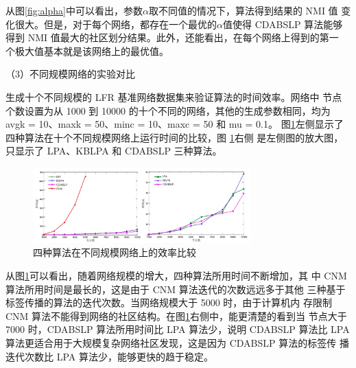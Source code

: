 从图\ref{fig:alpha}中可以看出，参数$\alpha$取不同值的情况下，算法得到结果的 NMI 值
变化很大。但是，对于每个网络，都存在一个最优的$\alpha$值使得 CDABSLP 算法能够
得到 NMI 值最大的社区划分结果。此外，还能看出，在每个网络上得到的第一
个极大值基本就是该网络上的最优值。

（3）不同规模网络的实验对比

生成十个不同规模的 LFR 基准网络数据集来验证算法的时间效率。网络中
节点个数设置为从 1000 到 10000 的十个不同的网络，其他的生成参数相同，均为
avgk = 10、maxk = 50、minc = 10、maxc = 50 和 mu = 0.1。 
图\ref{fig:butongguimowangluobijiao}左侧显示了四种算法在十个不同规模网络上运行时间的比较，图 \ref{fig:butongguimowangluobijiao}右侧
是左侧图的放大图，只显示了 LPA、KBLPA 和 CDABSLP 三种算法。

\begin{figure}
  \centering
  \includegraphics[width=0.75\textwidth]{figures/butongguimowangluobijiao}
  \caption{四种算法在不同规模网络上的效率比较}\label{fig:butongguimowangluobijiao}
\end{figure}

从图\ref{fig:butongguimowangluobijiao}可以看出，随着网络规模的增大，四种算法所用时间不断增加，其
中 CNM 算法所用时间是最长的，这是由于 CNM 算法迭代的次数远远多于其他
三种基于标签传播的算法的迭代次数。当网络规模大于 5000 时，由于计算机内
存限制 CNM 算法不能得到网络的社区结构。在图\ref{fig:butongguimowangluobijiao}右侧中，能更清楚的看到当
节点大于 7000 时，CDABSLP 算法所用时间比 LPA 算法少，说明 CDABSLP 算法比
LPA 算法更适合用于大规模复杂网络社区发现，这是因为 CDABSLP 算法的标签传
播迭代次数比 LPA 算法少，能够更快的趋于稳定。 




